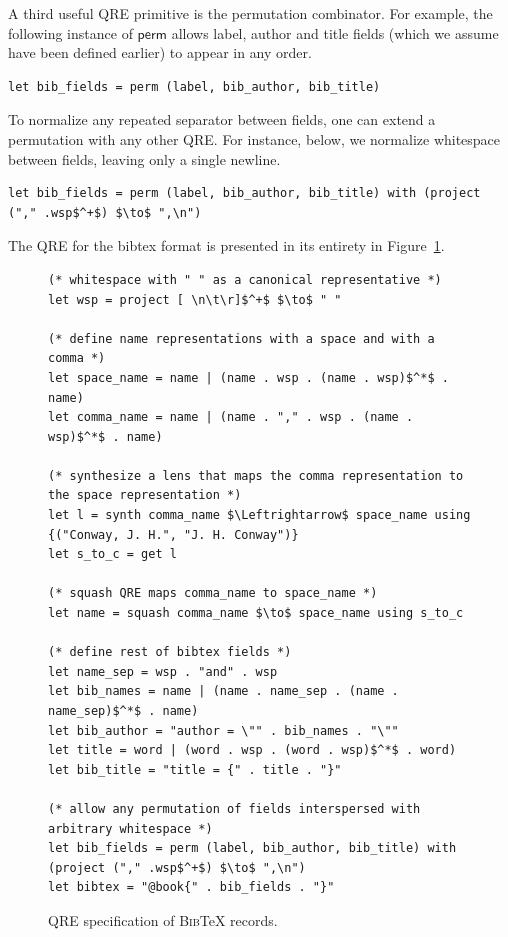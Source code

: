 \documentclass[acmsmall,review,anonymous]{acmart}
\newcommand{\kw}[1]{\ensuremath{\mathsf{#1}}}
\newcommand{\bibtex}{\textsc{Bib}\TeX{}}
\begin{document}
A third useful QRE primitive is the permutation combinator.  For example,
the following instance of \kw{perm} allows label, author and title fields
(which we assume have been defined earlier) to appear in any order.
%
\begin{lstlisting}
let bib_fields = perm (label, bib_author, bib_title)
\end{lstlisting}
%
To normalize any repeated separator between fields, one can extend a permutation
with any other QRE.  For instance, below, we normalize whitespace between fields,
leaving only a single newline.
%
\begin{lstlisting}
let bib_fields = perm (label, bib_author, bib_title) with (project ("," .wsp$^+$) $\to$ ",\n")
\end{lstlisting}
%
\noindent
The QRE for the bibtex format is presented in its entirety in Figure~\ref{fig:example-qre}.


\begin{figure}[t]
\begin{lstlisting}
(* whitespace with " " as a canonical representative *)
let wsp = project [ \n\t\r]$^+$ $\to$ " "

(* define name representations with a space and with a comma *)
let space_name = name | (name . wsp . (name . wsp)$^*$ . name)
let comma_name = name | (name . "," . wsp . (name . wsp)$^*$ . name)

(* synthesize a lens that maps the comma representation to the space representation *)
let l = synth comma_name $\Leftrightarrow$ space_name using {("Conway, J. H.", "J. H. Conway")}
let s_to_c = get l

(* squash QRE maps comma_name to space_name *)
let name = squash comma_name $\to$ space_name using s_to_c

(* define rest of bibtex fields *)
let name_sep = wsp . "and" . wsp
let bib_names = name | (name . name_sep . (name . name_sep)$^*$ . name)
let bib_author = "author = \"" . bib_names . "\""
let title = word | (word . wsp . (word . wsp)$^*$ . word)
let bib_title = "title = {" . title . "}"

(* allow any permutation of fields interspersed with arbitrary whitespace *)
let bib_fields = perm (label, bib_author, bib_title) with (project ("," .wsp$^+$) $\to$ ",\n")
let bibtex = "@book{" . bib_fields . "}"
\end{lstlisting}
\caption{QRE specification of \bibtex{} records. }
\label{fig:example-qre}
\end{figure}

\end{document}
